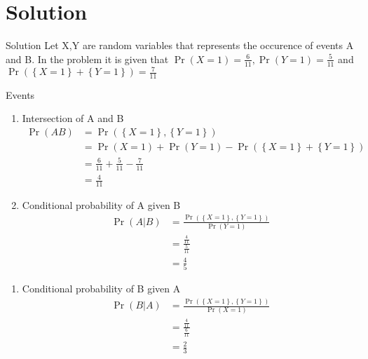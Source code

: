 \documentclass{beamer}
\providecommand{\pr}[1]{\ensuremath{\Pr\left(#1\right)}}
\providecommand{\cbrak}[1]{\ensuremath{\left\{#1\right\}}}
\newcounter{saveenumi}
\newcommand{\seti}{\setcounter{saveenumi}{\value{enumi}}}
\newcommand{\conti}{\setcounter{enumi}{\value{saveenumi}}}
\begin{document}
	\section{Solution}	
	\begin{frame}{Solution}
		Let X,Y are random variables that represents the occurence of events A and B. In the problem it is given that 
			$\pr{X=1}=\frac{6}{11},\pr{Y=1}=\frac{5}{11}$ and $\pr{\cbrak{X=1} +\cbrak{Y=1}}=\frac{7}{11}$
	\begin{table}[ht!]
	\centering
	
	\caption{Events}
	\label{table:1}
    \end{table}
	\end{frame}

	\begin{frame}{}
		\begin{enumerate}
			\item Intersection of A and B
			\begin{align}
				\pr{AB}&=\pr{\cbrak{X=1},\cbrak{Y=1}}
				\\
				&=\pr{X=1}+\pr{Y=1}-\pr{\cbrak{X=1}+\cbrak{Y=1}}    
				\\
				&=\frac{6}{11}+\frac{5}{11}-\frac{7}{11}
				\\
				&=\frac{4}{11}     
			\end{align}
			\item Conditional probability of A given B
			\begin{align}
				\pr{A|B}&=\frac{\pr{\cbrak{X=1},\cbrak{Y=1}}}{\pr{Y=1}}\\
				&=\frac{\frac{4}{11}}{\frac{5}{11}}\\
				&=\frac{4}{5}
			\end{align}
		\seti
		\end{enumerate}
	\end{frame}

\begin{frame}{}
	\begin{enumerate}
		\conti
		\item Conditional probability  of B given A
	\begin{align}
		\pr{B|A}&=\frac{\pr{\cbrak{X=1},\cbrak{Y=1}}}{\pr{X=1}}\\
		&=\frac{\frac{4}{11}}{\frac{6}{11}}\\
		&=\frac{2}{3}
	\end{align}
\end{enumerate}
\end{frame}
\end{document}
